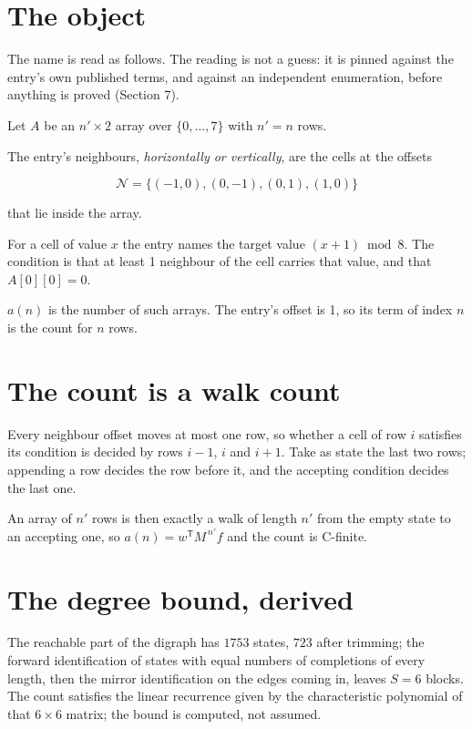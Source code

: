 \documentclass[11pt]{article}
\theoremstyle{definition}
\begin{document}
\section{The object}

The name is read as follows. The reading is not a guess: it is pinned against the entry's own published terms, and against an independent enumeration, before anything is proved (Section 7).

Let $A$ be an $n' \times 2$ array over $\{0,\dots,7\}$ with $n' = n$ rows.

The entry's neighbours, {\itshape horizontally or vertically}, are the cells at the offsets

\[\mathcal{N} = \{(-1,0), (0,-1), (0,1), (1,0)\}\]

that lie inside the array.

For a cell of value $x$ the entry names the target value $(x + 1) \bmod 8$. The condition is that at least 1 neighbour of the cell carries that value, and that $A[0][0] = 0$.

$a(n)$ is the number of such arrays. The entry's offset is 1, so its term of index $n$ is the count for $n$ rows.

\section{The count is a walk count}

Every neighbour offset moves at most one row, so whether a cell of row $i$ satisfies its condition is decided by rows $i-1$, $i$ and $i+1$. Take as state the last two rows; appending a row decides the row before it, and the accepting condition decides the last one.

An array of $n'$ rows is then exactly a walk of length $n'$ from the empty state to an accepting one, so $a(n) = w^{\mathsf T}M^{\,n'}f$ and the count is C-finite.

\section{The degree bound, derived}

The reachable part of the digraph has $1753$ states, $723$ after trimming; the forward identification of states with equal numbers of completions of every length, then the mirror identification on the edges coming in, leaves $S = 6$ blocks. The count satisfies the linear recurrence given by the characteristic polynomial of that $6\times6$ matrix; the bound is computed, not assumed.
\end{document}
